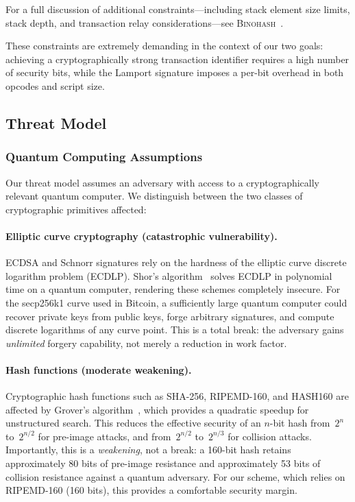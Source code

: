 \documentclass[11pt, a4paper]{article}
\begin{document}
\noindent For a full discussion of additional constraints---including stack element size limits, stack depth, and transaction relay considerations---see \textsc{Binohash}~\cite[Section~6]{linus2024binohash}.

These constraints are extremely demanding in the context of our two goals: achieving a cryptographically strong transaction identifier requires a high number of security bits, while the Lamport signature imposes a per-bit overhead in both opcodes and script size.

\subsection{Threat Model}
\label{sec:threat-model}

\subsubsection{Quantum Computing Assumptions}
\label{sec:quantum-assumptions}

Our threat model assumes an adversary with access to a cryptographically relevant quantum computer. We distinguish between the two classes of cryptographic primitives affected:

\paragraph{Elliptic curve cryptography (catastrophic vulnerability).}
ECDSA and Schnorr signatures rely on the hardness of the elliptic curve discrete logarithm problem (ECDLP). Shor's algorithm~\cite{shor1994} solves ECDLP in polynomial time on a quantum computer, rendering these schemes completely insecure. For the secp256k1 curve used in Bitcoin, a sufficiently large quantum computer could recover private keys from public keys, forge arbitrary signatures, and compute discrete logarithms of any curve point. This is a total break: the adversary gains \emph{unlimited} forgery capability, not merely a reduction in work factor.

\paragraph{Hash functions (moderate weakening).}
Cryptographic hash functions such as SHA-256, RIPEMD-160, and HASH160 are affected by Grover's algorithm~\cite{grover1996}, which provides a quadratic speedup for unstructured search. This reduces the effective security of an $n$-bit hash from~$2^n$ to~$2^{n/2}$ for pre-image attacks, and from~$2^{n/2}$ to~$2^{n/3}$ for collision attacks. Importantly, this is a \emph{weakening}, not a break: a 160-bit hash retains approximately 80 bits of pre-image resistance and approximately 53 bits of collision resistance against a quantum adversary. For our scheme, which relies on RIPEMD-160 (160 bits), this provides a comfortable security margin.
\end{document}
